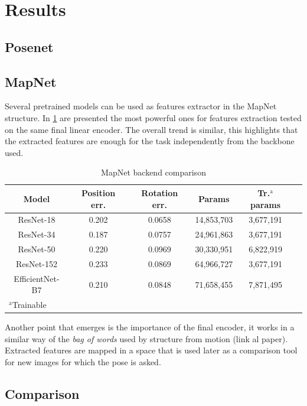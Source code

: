 \section{Results}
\subsection{Posenet}
\subsection{MapNet}
Several pretrained models can be used as features extractor in the MapNet structure. In \cref{tab:mapnet-backends} are presented the most powerful ones for features extraction tested on the same final linear encoder. The overall trend is similar, this highlights that the extracted features are enough for the task independently from the backbone used.
\begin{table}[htbp]
\caption{MapNet backend comparison}
\begin{center}
\begin{tabular}{|c|c|c|c|c|c|}
\hline
\textbf{Model}&\textbf{Position err.}&\textbf{Rotation err.}&\textbf{Params}&\textbf{Tr.$^{\mathrm{a}}$ params} \\
\hline
ResNet-18       &0.202&0.0658&14,853,703&3,677,191 \\
ResNet-34       &0.187&0.0757&24,961,863&3,677,191 \\
ResNet-50       &0.220&0.0969&30,330,951&6,822,919 \\
ResNet-152      &0.233&0.0869&64,966,727&3,677,191 \\
EfficientNet-B7 &0.210&0.0848&71,658,455&7,871,495 \\
\hline
\multicolumn{4}{l}{$^{\mathrm{a}}$Trainable}
\end{tabular}
\label{tab:mapnet-backends}
\end{center}
\end{table}

Another point that emerges is the importance of the final encoder, it works in a similar way of the \textit{bag of words} used by structure from motion (link al paper). Extracted features are mapped in a space that is used later as a comparison tool for new images for which the pose is asked.

\subsection{Comparison}
